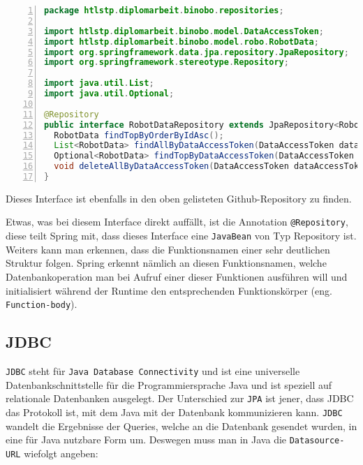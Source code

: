 \documentclass[paper=a4,12pt]{scrreprt}
\begin{document}
\begin{lstlisting}[caption={JPA-Repository Interface Implementierungen}, captionpos=b, label={listing:jpa_repo}, language=java, numbers=left,
  stepnumber=1]
package htlstp.diplomarbeit.binobo.repositories;

import htlstp.diplomarbeit.binobo.model.DataAccessToken;
import htlstp.diplomarbeit.binobo.model.robo.RobotData;
import org.springframework.data.jpa.repository.JpaRepository;
import org.springframework.stereotype.Repository;

import java.util.List;
import java.util.Optional;

@Repository
public interface RobotDataRepository extends JpaRepository<RobotData, Long> {
  RobotData findTopByOrderByIdAsc();
  List<RobotData> findAllByDataAccessToken(DataAccessToken dataAccessToken);
  Optional<RobotData> findTopByDataAccessToken(DataAccessToken dataAccessToken);
  void deleteAllByDataAccessToken(DataAccessToken dataAccessToken);
}
\end{lstlisting}

Dieses Interface ist ebenfalls in den oben gelisteten Github-Repository zu finden.\newline

Etwas, was bei diesem Interface direkt auffällt, ist die Annotation \texttt{@Repository}, diese teilt Spring mit, dass dieses Interface eine \texttt{JavaBean} von Typ Repository ist.\newline
Weiters kann man erkennen, dass die Funktionsnamen einer sehr deutlichen Struktur folgen. Spring erkennt nämlich an diesen Funktionsnamen, welche Datenbankoperation man bei Aufruf einer dieser Funktionen ausführen will und
initialisiert während der Runtime den entsprechenden Funktionskörper (eng. \texttt{Function-body}).\newline

\subsection{JDBC}
\label{sec:jdbc}

\texttt{JDBC} steht für \texttt{Java Database Connectivity} und ist eine universelle Datenbankschnittstelle für die Programmiersprache Java und ist speziell auf relationale Datenbanken ausgelegt\cite{spring_jdbc}.\newline
Der Unterschied zur \texttt{JPA} ist jener, dass JDBC das Protokoll ist, mit dem Java mit der Datenbank kommunizieren kann. \texttt{JDBC} wandelt die Ergebnisse der Queries, welche an die Datenbank gesendet wurden, in eine für Java
nutzbare Form um.\newline
Deswegen muss man in Java die \texttt{Datasource-URL} wiefolgt angeben:\newline
\end{document}

